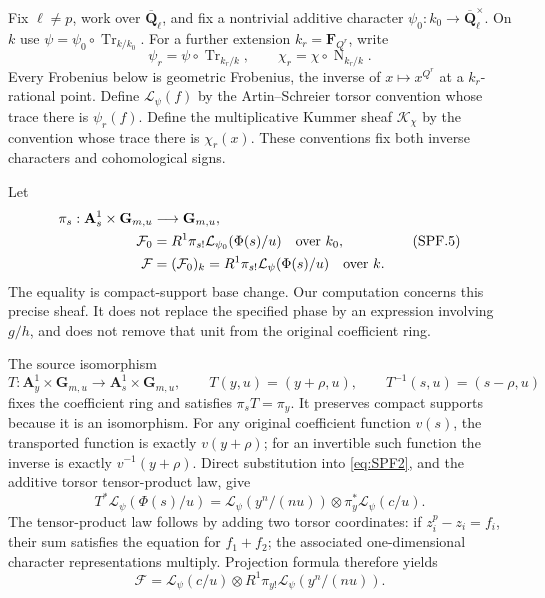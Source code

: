 Fix \(\ell\ne p\), work over \(\overline{\mathbf Q}_\ell\), and fix a
nontrivial additive character \(\psi_0:k_0\to
\overline{\mathbf Q}_\ell^\times\). On \(k\) use
\(\psi=\psi_0\circ\operatorname{Tr}_{k/k_0}\).
For a further extension \(k_r=\mathbf F_{Q^r}\), write
\[
 \psi_r=\psi\circ\operatorname{Tr}_{k_r/k},\qquad
 \chi_r=\chi\circ\operatorname{N}_{k_r/k}.
 \tag{SPF.4}\label{eq:SPF4}
\]
Every Frobenius below is geometric Frobenius, the inverse of
\(x\mapsto x^{Q^r}\) at a \(k_r\)-rational point. Define
\(\mathcal L_\psi(f)\) by the Artin--Schreier torsor convention whose
trace there is \(\psi_r(f)\). Define the multiplicative Kummer sheaf
\(\mathcal K_\chi\) by the convention whose trace there is
\(\chi_r(x)\). These conventions fix both inverse characters and
cohomological signs.

Let
\[
 \begin{split}
 \pi_s:\mathbf A^1_s\times\mathbf G_{m,u}&\longrightarrow
                  \mathbf G_{m,u},\\
 \mathcal F_0&=R^1\pi_{s!}\mathcal L_{\psi_0}(\Phi(s)/u)
                    \quad\hbox{over }k_0,\\
 \mathcal F&=(\mathcal F_0)_k
       =R^1\pi_{s!}\mathcal L_\psi(\Phi(s)/u)
                    \quad\hbox{over }k .
 \end{split}
 \tag{SPF.5}\label{eq:SPF5}
\]
The equality is compact-support base change. Our computation concerns
this precise sheaf. It does not replace the specified phase by
an expression involving \(g/h\), and does not remove that unit from
the original coefficient ring.

The source isomorphism
\[
 T:\mathbf A^1_y\times\mathbf G_{m,u}
       \longrightarrow\mathbf A^1_s\times\mathbf G_{m,u},
 \qquad T(y,u)=(y+\rho,u),\qquad
 T^{-1}(s,u)=(s-\rho,u)
 \tag{SPF.6}\label{eq:SPF6}
\]
fixes the coefficient ring and satisfies \(\pi_sT=\pi_y\).
It preserves compact supports because it is an isomorphism.
For any original coefficient function \(v(s)\), the transported
function is exactly \(v(y+\rho)\); for an invertible such function
the inverse is exactly \(v^{-1}(y+\rho)\).
Direct substitution into \eqref{eq:SPF2}, and the additive torsor
tensor-product law, give
\[
 T^*\mathcal L_\psi(\Phi(s)/u)
  =\mathcal L_\psi(y^n/(nu))
      \otimes\pi_y^*\mathcal L_\psi(c/u).
 \tag{SPF.7}\label{eq:SPF7}
\]
The tensor-product law follows by adding two torsor coordinates:
if \(z_i^p-z_i=f_i\), their sum satisfies the equation for \(f_1+f_2\);
the associated one-dimensional character representations multiply.
Projection formula therefore yields
\[
 \mathcal F=
 \mathcal L_\psi(c/u)\otimes
 R^1\pi_{y!}\mathcal L_\psi(y^n/(nu)).
 \tag{SPF.8}\label{eq:SPF8}
\]

